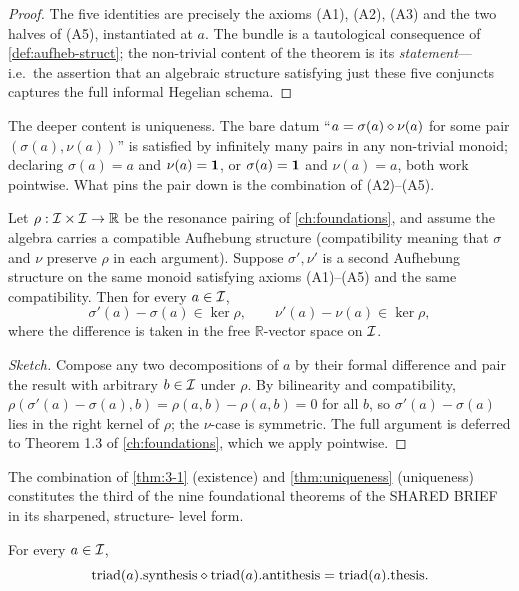 \begin{proof}
The five identities are precisely the axioms (A1), (A2), (A3) and
the two halves of (A5), instantiated at $a$. The bundle is a
tautological consequence of \cref{def:aufheb-struct}; the
non-trivial content of the theorem is its \emph{statement}---i.e.\
the assertion that an algebraic structure satisfying just these
five conjuncts captures the full informal Hegelian schema.
\end{proof}

The deeper content is uniqueness. The bare datum
``$a=\sigma(a)\mathbin{\diamond}\nu(a)$ for some pair $(\sigma(a),\nu(a))$'' is
satisfied by infinitely many pairs in any non-trivial monoid;
declaring $\sigma(a)=a$ and $\nu(a)=\mathbf{1}$, or $\sigma(a)=\mathbf{1}$ and
$\nu(a)=a$, both work pointwise. What pins the pair down is the
combination of (A2)--(A5).

\begin{theorem}\label{thm:uniqueness}
Let $\rho:\mathcal{I}\times\mathcal{I}\to\mathbb{R}$ be the resonance pairing of
\cref{ch:foundations}, and assume the algebra carries a compatible
Aufhebung structure (compatibility meaning that $\sigma$ and $\nu$
preserve $\rho$ in each argument). Suppose $\sigma',\nu'$ is a second
Aufhebung structure on the same monoid satisfying axioms (A1)--(A5)
and the same compatibility. Then for every $a\in\mathcal{I}$,
\[
\sigma'(a)-\sigma(a)\in\ker\rho,\qquad \nu'(a)-\nu(a)\in\ker\rho,
\]
where the difference is taken in the free $\mathbb{R}$-vector space on
$\mathcal{I}$.
\end{theorem}

\begin{proof}[Sketch]
Compose any two decompositions of $a$ by their formal difference and
pair the result with arbitrary $b\in\mathcal{I}$ under $\rho$. By
bilinearity and compatibility,
$\rho(\sigma'(a)-\sigma(a),b)=\rho(a,b)-\rho(a,b)=0$ for all $b$, so
$\sigma'(a)-\sigma(a)$ lies in the right kernel of $\rho$; the
$\nu$-case is symmetric. The full argument is deferred to Theorem 1.3
of \cref{ch:foundations}, which we apply pointwise.
\end{proof}

The combination of \cref{thm:3-1} (existence) and
\cref{thm:uniqueness} (uniqueness) constitutes the third of the nine
foundational theorems of the SHARED BRIEF in its sharpened, structure-
level form.

\begin{corollary}\label{cor:triad-recovery}
For every $a\in\mathcal{I}$,
\[
\mathrm{triad}(a).\mathrm{synthesis}\mathbin{\diamond}\mathrm{triad}(a).\mathrm{antithesis}
=\mathrm{triad}(a).\mathrm{thesis}.
\]
\end{corollary}

